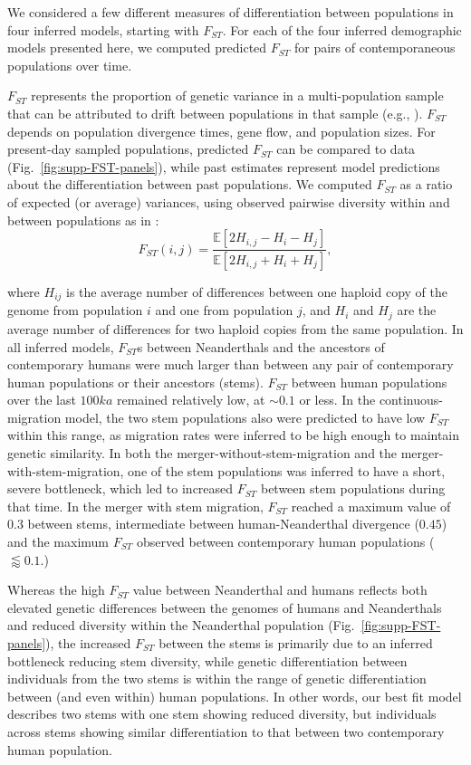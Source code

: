 \documentclass[]{article}
\newcommand{\E}{\mathbb{E}}
\begin{document}
We considered a few different measures of differentiation between populations
in four inferred models, starting with $F_{ST}.$ For each of the four inferred
demographic models presented here, we computed predicted $F_{ST}$ for pairs of
contemporaneous populations over time. 

$F_{ST}$ represents the proportion of genetic variance in a multi-population
sample that can be attributed to drift between populations in that sample
(e.g., \cite{Bhatia2013-sq}).  $F_{ST}$ depends on population divergence times,
gene flow, and population sizes. For present-day sampled populations, predicted
$F_{ST}$ can be compared to data (Fig.~\ref{fig:supp-FST-panels}), while past
estimates represent model predictions about the differentiation between past
populations. We computed $F_{ST}$ as a ratio of expected (or average)
variances, using observed pairwise diversity within and between populations as
in \citet{Peter2016-ys}:
\begin{equation}
    F_{ST}(i, j) = \frac{\E[2H_{i,j} - H_i - H_j]}{\E[2H_{i,j} + H_i + H_j]},
    \label{eq:FST}
\end{equation}

where $H_{ij}$ is the average number of differences between one haploid copy of
the genome from population $i$ and one from population $j$, and $H_i$ and $H_j$
are the average number of differences for two haploid copies from the same
population. In all inferred models, $F_{ST}$s between Neanderthals and the
ancestors of contemporary humans were much larger than between any pair of contemporary
human populations or their ancestors (stems). $F_{ST}$ between human
populations over the last $100ka$ remained relatively low, at $\sim0.1$ or
less. In the continuous-migration model, the two stem populations also were
predicted to have low $F_{ST}$ within this range, as migration rates were
inferred to be high enough to maintain genetic similarity. In both the
merger-without-stem-migration and the merger-with-stem-migration, one of the
stem populations was inferred to have a short, severe bottleneck, which led to
increased $F_{ST}$ between stem populations during that time. In the merger
with stem migration, $F_{ST}$ reached a maximum value of $0.3$ between stems,
intermediate between human-Neanderthal divergence ($0.45$)
and the maximum $F_{ST}$ observed between contemporary human populations
($\lessapprox 0.1$.) 

Whereas the high $F_{ST}$ value between Neanderthal and humans reflects both
elevated genetic differences between the genomes of humans and
Neanderthals and reduced diversity within the Neanderthal population
(Fig.~\ref{fig:supp-FST-panels}), the increased $F_{ST}$ between the stems is
primarily due to an inferred bottleneck reducing stem diversity, while genetic
differentiation between individuals from the two stems is within the range of
genetic differentiation between (and even within) human populations. In other
words, our best fit model describes two stems with one stem showing reduced
diversity, but individuals across stems showing similar differentiation to
that between two contemporary human population.
\end{document}
